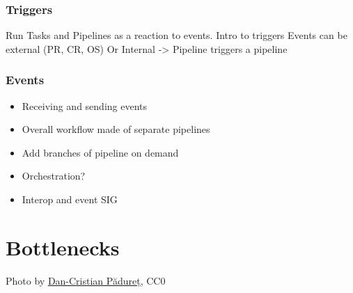 \documentclass[aspectratio=169,11pt,hyperref={colorlinks=true}]{beamer}
\begin{document}
\begin{grayframe}
  \frametitle{Triggers}
  Run Tasks and Pipelines as a reaction to events.
  Intro to triggers
  Events can be external (PR, CR, OS)
  Or Internal -> Pipeline triggers a pipeline
\end{grayframe}

\begin{grayframe}
  \frametitle{Events}
  \begin{itemize}
    \item Receiving and sending events
    \item Overall workflow made of separate pipelines
    \item Add branches of pipeline on demand
    \item Orchestration?
    \item Interop and event SIG
  \end{itemize}
\end{grayframe}

\section[Bottlenecks]{Bottlenecks}
\begin{sectionwithpicrx}{Photo by \href{https://unsplash.com/@dancristianp}{\underline{Dan-Cristian Pădureț}}, CC0}
\end{sectionwithpicrx}
\end{document}
